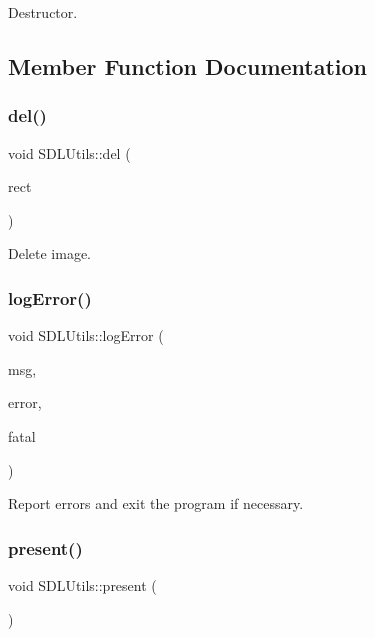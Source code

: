 Destructor. 



\subsection{Member Function Documentation}
\mbox{\label{class_s_d_l_utils_a8dfdc8f41938c2c53ac5121c10eb1638}} 
\subsubsection{\texorpdfstring{del()}{del()}}
{\footnotesize\ttfamily void S\+D\+L\+Utils\+::del (\begin{DoxyParamCaption}\item[{S\+D\+L\+\_\+\+Rect}]{rect }\end{DoxyParamCaption})\hspace{0.3cm}{\ttfamily [virtual]}}



Delete image. 

\mbox{\label{class_s_d_l_utils_ad74f19327d940a7fea1a8178d81768e7}} 
\subsubsection{\texorpdfstring{log\+Error()}{logError()}}
{\footnotesize\ttfamily void S\+D\+L\+Utils\+::log\+Error (\begin{DoxyParamCaption}\item[{const std\+::string \&}]{msg,  }\item[{const std\+::string \&}]{error,  }\item[{bool}]{fatal }\end{DoxyParamCaption})}



Report errors and exit the program if necessary. 

\mbox{\label{class_s_d_l_utils_a0e9c4b007ae61772a1c41592877b30ab}} 
\subsubsection{\texorpdfstring{present()}{present()}}
{\footnotesize\ttfamily void S\+D\+L\+Utils\+::present (\begin{DoxyParamCaption}{ }\end{DoxyParamCaption})\hspace{0.3cm}{\ttfamily [virtual]}}



